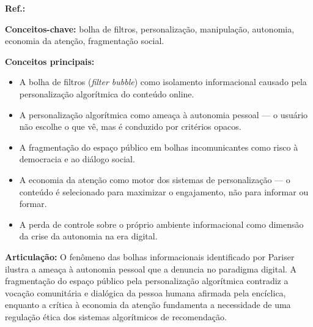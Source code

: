 \begin{fichamento}
    \textbf{Ref.:} \cite{Pariser2022THP}
    
    \textbf{Conceitos-chave:} bolha de filtros, personalização, manipulação, autonomia, economia da atenção, fragmentação social.
    
    \textbf{Conceitos principais:}
    \begin{itemize}
        \item A bolha de filtros (\textit{filter bubble}) como isolamento informacional causado pela personalização algorítmica do conteúdo online.
        \item A personalização algorítmica como ameaça à autonomia pessoal — o usuário não escolhe o que vê, mas é conduzido por critérios opacos.
        \item A fragmentação do espaço público em bolhas incomunicantes como risco à democracia e ao diálogo social.
        \item A economia da atenção como motor dos sistemas de personalização — o conteúdo é selecionado para maximizar o engajamento, não para informar ou formar.
        \item A perda de controle sobre o próprio ambiente informacional como dimensão da crise da autonomia na era digital.
    \end{itemize}
    
    \textbf{Articulação:} O fenômeno das bolhas informacionais identificado por Pariser ilustra a ameaça à autonomia pessoal que a \MH{} denuncia no paradigma digital. A fragmentação do espaço público pela personalização algorítmica contradiz a vocação comunitária e dialógica da pessoa humana afirmada pela encíclica, enquanto a crítica à economia da atenção fundamenta a necessidade de uma regulação ética dos sistemas algorítmicos de recomendação.
\end{fichamento}

